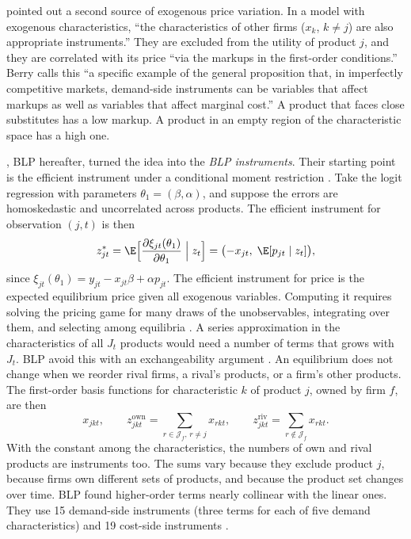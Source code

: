 \citet[p.~249]{Berry1994} pointed out a second source of exogenous price variation. In a model with exogenous
characteristics, ``the characteristics of other firms ($x_k$, $k \neq j$) are also appropriate instruments.'' They are
excluded from the utility of product $j$, and they are correlated with its price ``via the markups in the first-order
conditions.'' Berry calls this ``a specific example of the general proposition that, in imperfectly competitive markets,
demand-side instruments can be variables that affect markups as well as variables that affect marginal cost.'' A
product that faces close substitutes has a low markup. A product in an empty region of the characteristic space has a
high one.

\citet[Section~5.1]{BerryLevinsohnPakes1995}, BLP hereafter, turned the idea into the \emph{BLP instruments}. Their starting point is
the efficient instrument under a conditional moment restriction \citep{Chamberlain1987}. Take the logit regression with
parameters $\theta_1 = (\beta, \alpha)$, and suppose the errors are homoskedastic and uncorrelated across products. The
efficient instrument for observation $(j, t)$ is then
\begin{equation}\label{eq:07-optimal-iv}
  z^{*}_{jt} = \E\Bigl[\frac{\partial\xi_{jt}(\theta_1)}{\partial\theta_1} \Bigm| z_t\Bigr]
  = \bigl(-x_{jt},\; \E[p_{jt} \mid z_t]\bigr),
\end{equation}
since $\xi_{jt}(\theta_1) = y_{jt} - x_{jt}\beta + \alpha p_{jt}$. The efficient instrument for price is the expected
equilibrium price given all exogenous variables. Computing it requires solving the pricing game for many draws of the
unobservables, integrating over them, and selecting among equilibria \citep[p.~860]{BerryLevinsohnPakes1995}. A series
approximation in the characteristics of all $J_t$ products would need a number of terms that grows with $J_t$. BLP
avoid this with an exchangeability argument \citep{Pakes1994}. An equilibrium does not change when we reorder rival
firms, a rival's products, or a firm's other products. The first-order basis functions for characteristic $k$ of
product $j$, owned by firm $f$, are then
\begin{equation}\label{eq:07-blp-iv}
  x_{jkt}, \qquad z^{\mathrm{own}}_{jkt} = \sum_{r \in \mathcal{J}_f,\, r \neq j} x_{rkt}, \qquad
  z^{\mathrm{riv}}_{jkt} = \sum_{r \notin \mathcal{J}_f} x_{rkt}.
\end{equation}
With the constant among the characteristics, the numbers of own and rival products are instruments too. The sums vary
because they exclude product $j$, because firms own different sets of products, and because the product set changes
over time. BLP found higher-order terms nearly collinear with the linear ones. They use 15 demand-side instruments
(three terms for each of five demand characteristics) and 19 cost-side instruments
\citep[pp.~861--862]{BerryLevinsohnPakes1995}.

